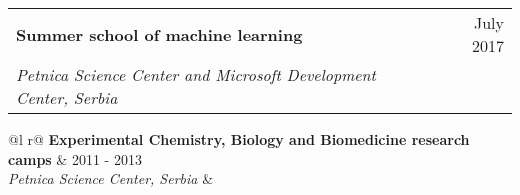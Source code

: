 \documentclass[a4paper,12pt]{article}
\begin{document}
\begin{tabularx}{\linewidth}{ @{}l r@{} }
\textbf{Summer school of machine learning} & \hfill \qquad \qquad \qquad \qquad \qquad  \quad July 2017 \\
\textit{Petnica Science Center and Microsoft Development Center, Serbia} & \\[3.75pt]
\end{tabularx}

\begin{tabularx}{\linewidth}{ @{}l r@{} }
\textbf{Experimental Chemistry, Biology and Biomedicine research camps} & \hfill 2011 - 2013 \\
\textit{Petnica Science Center, Serbia} & \\[3.75pt]
\end{tabularx}


\end{document}
